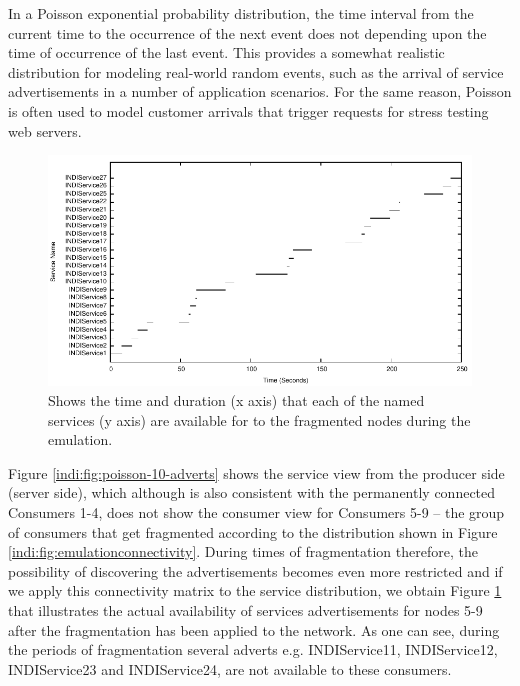 In a Poisson exponential probability distribution, the time interval from the current time to the occurrence of the next event does not depending upon the time of occurrence of the last event. This provides a somewhat realistic distribution for modeling real-world random events, such as the arrival of service advertisements in a number of application scenarios. For the same reason, Poisson is often used to model customer arrivals that trigger requests for stress testing web servers.

\begin{figure}
\centering
\includegraphics[scale=1.0]{indi10advert-distribution-fragmented.pdf}
\caption{Shows the time and duration (x axis) that each of the named services (y axis) are available for to the fragmented nodes during the emulation.} 
\label{indi:fig:poisson-10-adverts-frag}
\end{figure}


Figure \ref{indi:fig:poisson-10-adverts}  shows the service view from the producer side (server side), which although is also consistent with the permanently connected Consumers 1-4, does not show the consumer view for Consumers 5-9 -- the group of consumers that get fragmented according to the distribution shown in Figure \ref{indi:fig:emulationconnectivity}.  During times of fragmentation therefore, the possibility of discovering the advertisements becomes even more restricted and if we apply this connectivity matrix to the service distribution, we obtain Figure \ref{indi:fig:poisson-10-adverts-frag} that illustrates the actual availability of services advertisements for nodes 5-9 after the fragmentation has been applied to the network.  As one can see, during the periods of fragmentation several adverts e.g. INDIService11, INDIService12, INDIService23 and INDIService24, are not available to these consumers.   

